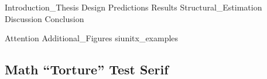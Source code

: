 \documentclass[12pt, a4paper, oneside, full]{article}
\begin{document}
\title{\thesistitle}
\author{\thesisauthor}
\date{\today}



{Introduction_Thesis}
{Design}
{Predictions}
{Results}
{Structural_Estimation}
{Discussion}
{Conclusion}

\clearpage

\begin{appendices}
	\label{sec:appendix}
	\FloatBarrier
	{Attention}
	\FloatBarrier
	\clearpage
	{Additional_Figures}
	\FloatBarrier
	{siunitx_examples}
	\clearpage
	
	\renewcommand{\showfamily}{{\color{magenta}%
		Serif%
	}}
	{\rmfamily\mdseries%
	 \subsection{Math ``Torture'' Test \showfamily}
	}
\end{appendices}

\clearpage %


\begin{refcontext}[sorting=nyt]  %
\sloppy
\printbibliography[heading=bibintoc]
\end{refcontext}


\end{document}
